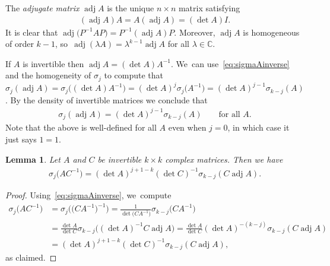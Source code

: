\documentclass[10pt,a4paper]{amsart}
\def\C{\mathbb{C}}
\def\adj{\operatorname{adj}}
\newtheorem{Lemma}[Theorem]{Lemma}
\numberwithin{equation}{section}
\begin{document}
The \emph{adjugate matrix} $\adj A$ is the unique $n \times n$ matrix satisfying
\begin{gather*} %
(\adj A) A = A (\adj A) = (\det A)I.
\end{gather*}
It is clear that $\adj \big(P^{-1} A P\big) = P^{-1} (\adj A) P$. Moreover, $\adj A$ is homogeneous of order $k-1$, so~$\adj(\lambda A) = \lambda^{k-1} \adj A$ for all $\lambda \in \C$.

If $A$ is invertible then $\adj A = (\det A) A^{-1}$. We~can use~\eqref{eq:sigmaAinverse} and the homogeneity of $\sigma_j$ to compute that $\sigma_j(\adj A) = \sigma_j \big( (\det A) A^{-1} \big) = (\det A)^j \sigma_j \big(A^{-1}\big) = (\det A)^{j-1} \sigma_{k-j}(A)$. By the density of invertible matrices we conclude that
\begin{gather} \label{eq:sigmaadjA}
\sigma_j (\adj A) = (\det A)^{j-1} \sigma_{k-j} (A) \qquad \text{for all $A$.}
\end{gather}
Note that the above is well-defined for all $A$ even when $j=0$, in which case it just says $1=1$.

\begin{Lemma} \label{lemma:sigma-adj-1}
Let $A$ and $C$ be \emph{invertible} $k \times k$ complex matrices. Then we have
\begin{gather*} %
\sigma_j \big(A C^{-1}\big) = (\det A)^{j+1-k} (\det C)^{-1} \sigma_{k-j} (C \adj A).
\end{gather*}
\end{Lemma}
\begin{proof}
Using~\eqref{eq:sigmaAinverse}, we~compute
\begin{align*}
\sigma_j \big(A C^{-1}\big) & = \sigma_j \big( \big(C A^{-1}\big)^{-1} \big) = \frac{1}{\det \big(C A^{-1}\big)} \sigma_{k-j} \big(C A^{-1}\big) \\
& = \frac{\det A}{\det C} \sigma_{k-j} \big( (\det A)^{-1} C \adj A\big) = \frac{\det A}{\det C} (\det A)^{-(k-j)} \sigma_{k-j} (C \adj A) \\
& = (\det A)^{j+1-k} (\det C)^{-1} \sigma_{k-j} (C \adj A),
\end{align*}
as claimed.
\end{proof}
\end{document}
